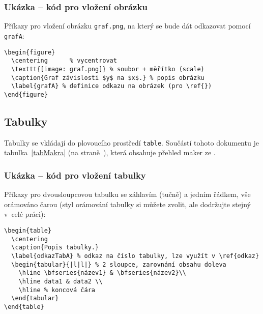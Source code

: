 \subsubsection*{Ukázka -- kód pro vložení obrázku}
Příkazy pro vložení obrázku \texttt{graf.png}, na který se bude dát odkazovat pomocí \texttt{grafA}:
\begin{verbatim}
\begin{figure}
  \centering      % vycentrovat
  \texttt{[image: graf.png]} % soubor + měřítko (scale)
  \caption{Graf závislosti $y$ na $x$.} % popis obrázku
  \label{grafA} % definice odkazu na obrázek (pro \ref{})
\end{figure}
\end{verbatim}

\subsection{Tabulky} 
Tabulky se vkládají do plovoucího prostředí \texttt{table}. Součástí tohoto dokumentu je tabulka~\ref{tabMakra} (na straně~\pageref{tabMakra}), která obsahuje přehled maker ze .

\subsubsection*{Ukázka -- kód pro vložení tabulky}
Příkazy pro dvousloupcovou tabulku se záhlavím (tučně) a jedním řádkem, vše orámováno čarou (styl orámování tabulky si můžete zvolit, ale dodržujte stejný v~celé práci): 
\begin{verbatim}
\begin{table}
  \centering
  \caption{Popis tabulky.} 
  \label{odkazTabA} % odkaz na číslo tabulky, lze využít v \ref{odkaz}
  \begin{tabular}{|l|l|} % 2 sloupce, zarovnání obsahu doleva
    \hline \bfseries{název1} & \bfseries{název2}\\
    \hline data1 & data2 \\
    \hline % koncová čára
  \end{tabular}
\end{table}
\end{verbatim}


